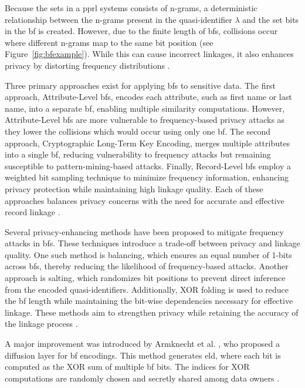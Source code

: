 Because the sets in a \ac{pprl} systems consists of n-grams, a deterministic relationship between the n-grams present in the quasi-identifier $\lambda$ and the set bits in the \ac{bf} is created.
However, due to the finite length of \ac{bf}s, collisions occur where different n-grams map to the same bit position (see Figure~\ref{fig:bfexample}).
While this can cause incorrect linkages, it also enhances privacy by distorting frequency distributions \cite{vidanage2020graph,schaefer2024}.

Three primary approaches exist for applying \ac{bf}s to sensitive data.
The first approach, Attribute-Level \ac{bf}s, encodes each attribute, such as first name or last name, into a separate \ac{bf}, enabling multiple similarity computations.
However, Attribute-Level \ac{bf}s are more vulnerable to frequency-based privacy attacks as they lower the collisions which would occur using only one \ac{bf}.
The second approach, Cryptographic Long-Term Key Encoding, merges multiple attributes into a single \ac{bf}, reducing vulnerability to frequency attacks but remaining susceptible to pattern-mining-based attacks.
Finally, Record-Level \ac{bf}s employ a weighted bit sampling technique to minimize frequency information, enhancing privacy protection while maintaining high linkage quality.
Each of these approaches balances privacy concerns with the need for accurate and effective record linkage \cite{vidanage2020graph}.

Several privacy-enhancing methods have been proposed to mitigate frequency attacks in \ac{bf}s.
These techniques introduce a trade-off between privacy and linkage quality.
One such method is balancing, which ensures an equal number of 1-bits across \ac{bf}s, thereby reducing the likelihood of frequency-based attacks.
Another approach is salting, which randomizes bit positions to prevent direct inference from the encoded quasi-identifiers.
Additionally, XOR folding is used to reduce the \ac{bf} length while maintaining the bit-wise dependencies necessary for effective linkage.
These methods aim to strengthen privacy while retaining the accuracy of the linkage process \cite{vidanage2020graph,schaefer2024}.

A major improvement was introduced by Armknecht et al. \cite{armknecht2023strengthening}, who proposed a diffusion layer for \ac{bf} encodings.
This method generates \ac{eld}, where each bit is computed as the XOR sum of multiple \ac{bf} bits.
The indices for XOR computations are randomly chosen and secretly shared among data owners \cite{armknecht2023strengthening}.

